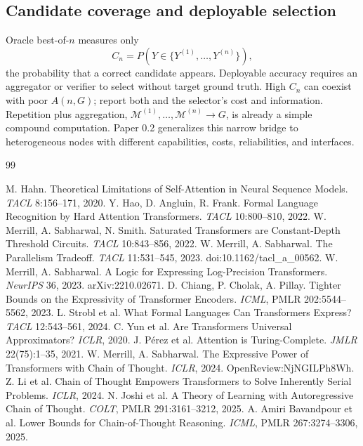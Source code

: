 \documentclass[10pt]{article}
\begin{document}
\subsection{Candidate coverage and deployable selection}
Oracle best-of-$n$ measures only
\[
C_n=P\!\left(Y\in\{Y^{(1)},\ldots,Y^{(n)}\}\right),
\]
the probability that a correct candidate appears. Deployable accuracy requires an aggregator or verifier to select without target ground truth. High $C_n$ can coexist with poor $A(n,G)$; report both and the selector's cost and information. Repetition plus aggregation, $\mathcal M^{(1)},\ldots,\mathcal M^{(n)}\to G$, is already a simple compound computation. Paper 0.2 generalizes this narrow bridge to heterogeneous nodes with different capabilities, costs, reliabilities, and interfaces.

\begin{sloppypar}\begin{thebibliography}{99}\raggedright
{} M. Hahn. Theoretical Limitations of Self-Attention in Neural Sequence Models. \emph{TACL} 8:156--171, 2020.
 Y. Hao, D. Angluin, R. Frank. Formal Language Recognition by Hard Attention Transformers. \emph{TACL} 10:800--810, 2022.
 W. Merrill, A. Sabharwal, N. Smith. Saturated Transformers are Constant-Depth Threshold Circuits. \emph{TACL} 10:843--856, 2022.
 W. Merrill, A. Sabharwal. The Parallelism Tradeoff. \emph{TACL} 11:531--545, 2023. doi:10.1162/tacl\_a\_00562.
 W. Merrill, A. Sabharwal. A Logic for Expressing Log-Precision Transformers. \emph{NeurIPS} 36, 2023. arXiv:2210.02671.
 D. Chiang, P. Cholak, A. Pillay. Tighter Bounds on the Expressivity of Transformer Encoders. \emph{ICML}, PMLR 202:5544--5562, 2023.
 L. Strobl et al. What Formal Languages Can Transformers Express? \emph{TACL} 12:543--561, 2024.
 C. Yun et al. Are Transformers Universal Approximators? \emph{ICLR}, 2020.
 J. P\'erez et al. Attention is Turing-Complete. \emph{JMLR} 22(75):1--35, 2021.
 W. Merrill, A. Sabharwal. The Expressive Power of Transformers with Chain of Thought. \emph{ICLR}, 2024. OpenReview:NjNGILPh8Wh.
 Z. Li et al. Chain of Thought Empowers Transformers to Solve Inherently Serial Problems. \emph{ICLR}, 2024.
 N. Joshi et al. A Theory of Learning with Autoregressive Chain of Thought. \emph{COLT}, PMLR 291:3161--3212, 2025.
 A. Amiri Bavandpour et al. Lower Bounds for Chain-of-Thought Reasoning. \emph{ICML}, PMLR 267:3274--3306, 2025.

\end{thebibliography}
\end{sloppypar}
\end{document}
